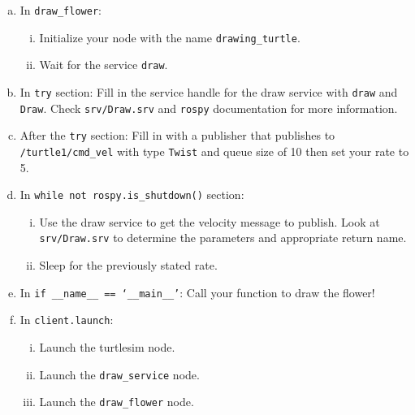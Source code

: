 \begin{enumerate}[(a)]
  \item In \texttt{draw\_flower}:
  \begin{enumerate}[i.]
    \item Initialize your node with the name \texttt{drawing\_turtle}.
    \item Wait for the service \texttt{draw}.
  \end{enumerate}
  
  \item In \texttt{try} section: Fill in the service handle for the draw service with \texttt{draw}
  and \texttt{Draw}. Check \texttt{srv/Draw.srv} and \texttt{rospy} documentation for more information.

  \item After the \texttt{try} section: Fill in with a publisher that publishes to
  \texttt{/turtle1/cmd\_vel} with type \texttt{Twist} and queue size of 10 then set your rate to 5.

  \item In \texttt{while not rospy.is\_shutdown()} section:
  \begin{enumerate}[i.]
    \item Use the draw service to get the velocity message to publish. Look at
    \texttt{srv/Draw.srv} to determine the parameters and appropriate return name.
    \item Sleep for the previously stated rate.
  \end{enumerate}

  \item In \texttt{if \_\_name\_\_ == `\_\_main\_\_'}: Call your function to draw the flower!

  \item In \texttt{client.launch}:
  \begin{enumerate}[i.]
    \item Launch the turtlesim node.
    \item Launch the \texttt{draw\_service} node.
    \item  Launch the \texttt{draw\_flower} node.
  \end{enumerate}

\end{enumerate}



